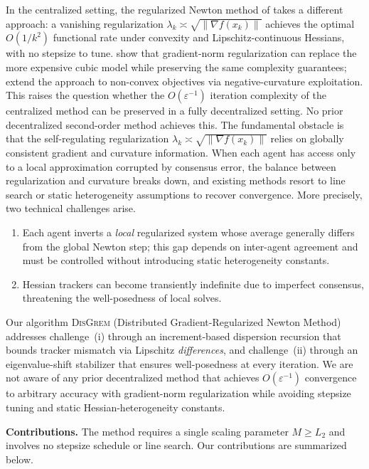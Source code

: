 \documentclass[11pt,a4paper]{article}
\def\cO{O}%
\newcommand{\cO}{\mathcal{O}}
\begin{document}
	In the centralized setting, the regularized Newton method of
	\citet{mishchenko2023rn} takes a different approach:
	a vanishing regularization $\lambda_k\asymp\sqrt{\|\nabla f(x_k)\|}$
	achieves the optimal $\cO(1/k^2)$ functional rate under convexity
	and Lipschitz-continuous Hessians, with no stepsize to tune.
	\citet{doikov2024gradient} show that gradient-norm regularization
	can replace the more expensive cubic model
	\citep{nesterov2006cubic,cartis2011arc} while preserving the
	same complexity guarantees;
	\citet{ding2025nonconvex} extend the approach to non-convex
	objectives via negative-curvature exploitation.
	This raises the question whether the
	$\cO(\varepsilon^{-1})$ iteration complexity of the centralized
	method can be preserved in a fully decentralized setting.
	No prior decentralized second-order method achieves this.
	The fundamental obstacle is that the self-regulating regularization
	$\lambda_k\asymp\sqrt{\|\nabla f(x_k)\|}$ relies on globally
	consistent gradient and curvature information.
	When each agent has access only to a local approximation corrupted
	by consensus error, the balance between regularization and curvature
	breaks down, and existing methods resort to line search or static
	heterogeneity assumptions to recover convergence.
	More precisely, two technical challenges arise.
	\begin{enumerate}[label=(\roman*),leftmargin=2em,itemsep=2pt]
	\item Each agent inverts a \emph{local} regularized system whose
	average generally differs from the global Newton step; this gap
	depends on inter-agent agreement and must be controlled without
	introducing static heterogeneity constants.
	\item Hessian trackers can become transiently indefinite due to
	imperfect consensus, threatening the well-posedness of local solves.
	\end{enumerate}
	Our algorithm \textsc{DisGrem} (Distributed Gradient-Regularized
	Newton Method) addresses challenge~(i) through an increment-based
	dispersion recursion that bounds tracker mismatch via Lipschitz
	\emph{differences}, and challenge~(ii) through an eigenvalue-shift
	stabilizer that ensures well-posedness at every iteration.
	We are not aware of any prior decentralized method that achieves
	$\cO(\varepsilon^{-1})$ convergence to arbitrary accuracy
	with gradient-norm regularization while avoiding stepsize tuning and
	static Hessian-heterogeneity constants.
	
\smallskip
\noindent\textbf{Contributions.}
The method requires a single scaling parameter $M\ge L_2$ and
involves no stepsize schedule or line search.
Our contributions are summarized below.
\end{document}
